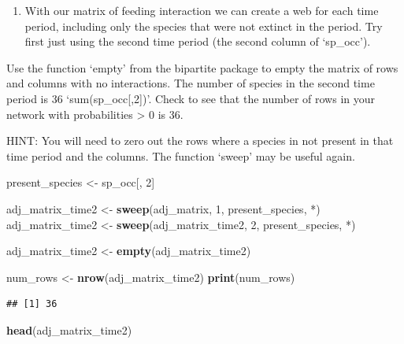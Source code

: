 \documentclass[
]{article}
\newenvironment{Shaded}{\begin{snugshade}}{\end{snugshade}}
\newcommand{\AttributeTok}[1]{\textcolor[rgb]{0.13,0.29,0.53}{#1}}
\newcommand{\DecValTok}[1]{\textcolor[rgb]{0.00,0.00,0.81}{#1}}
\newcommand{\FunctionTok}[1]{\textcolor[rgb]{0.13,0.29,0.53}{\textbf{#1}}}
\newcommand{\NormalTok}[1]{#1}
\newcommand{\OtherTok}[1]{\textcolor[rgb]{0.56,0.35,0.01}{#1}}
\newcommand{\StringTok}[1]{\textcolor[rgb]{0.31,0.60,0.02}{#1}}
\providecommand{\tightlist}{%
  \setlength{\itemsep}{0pt}\setlength{\parskip}{0pt}}
\begin{document}
\begin{enumerate}
\def\labelenumi{\alph{enumi}.}
\tightlist
\item
  With our matrix of feeding interaction we can create a web for each
  time period, including only the species that were not extinct in the
  period. Try first just using the second time period (the second column
  of `sp\_occ').
\end{enumerate}

Use the function `empty' from the bipartite package to empty the matrix
of rows and columns with no interactions. The number of species in the
second time period is 36 `sum(sp\_occ{[},2{]})'. Check to see that the
number of rows in your network with probabilities \textgreater{} 0 is
36.

HINT: You will need to zero out the rows where a species in not present
in that time period and the columns. The function `sweep' may be useful
again.

\begin{Shaded}
\begin{Highlighting}[]
\NormalTok{present\_species }\OtherTok{\textless{}{-}}\NormalTok{ sp\_occ[, }\DecValTok{2}\NormalTok{]}

\NormalTok{adj\_matrix\_time2 }\OtherTok{\textless{}{-}} \FunctionTok{sweep}\NormalTok{(adj\_matrix, }\DecValTok{1}\NormalTok{, present\_species, }\StringTok{\textasciigrave{}}\AttributeTok{*}\StringTok{\textasciigrave{}}\NormalTok{)}
\NormalTok{adj\_matrix\_time2 }\OtherTok{\textless{}{-}} \FunctionTok{sweep}\NormalTok{(adj\_matrix\_time2, }\DecValTok{2}\NormalTok{, present\_species, }\StringTok{\textasciigrave{}}\AttributeTok{*}\StringTok{\textasciigrave{}}\NormalTok{)}

\NormalTok{adj\_matrix\_time2 }\OtherTok{\textless{}{-}} \FunctionTok{empty}\NormalTok{(adj\_matrix\_time2)}

\NormalTok{num\_rows }\OtherTok{\textless{}{-}} \FunctionTok{nrow}\NormalTok{(adj\_matrix\_time2)}
\FunctionTok{print}\NormalTok{(num\_rows)}
\end{Highlighting}
\end{Shaded}

\begin{verbatim}
## [1] 36
\end{verbatim}

\begin{Shaded}
\begin{Highlighting}[]
\FunctionTok{head}\NormalTok{(adj\_matrix\_time2)}
\end{Highlighting}
\end{Shaded}
\end{document}

